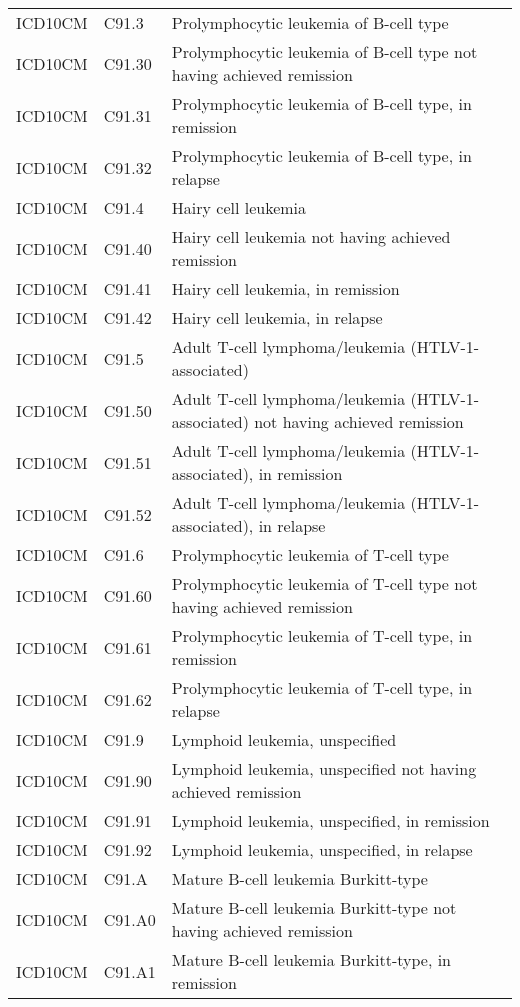 \begin{longtable}{p{}p{}p{}}
  ICD10CM & C91.3 & Prolymphocytic leukemia of B-cell type \\ 
  ICD10CM & C91.30 & Prolymphocytic leukemia of B-cell type not having achieved remission \\ 
  ICD10CM & C91.31 & Prolymphocytic leukemia of B-cell type, in remission \\ 
  ICD10CM & C91.32 & Prolymphocytic leukemia of B-cell type, in relapse \\ 
  ICD10CM & C91.4 & Hairy cell leukemia \\ 
  ICD10CM & C91.40 & Hairy cell leukemia not having achieved remission \\ 
  ICD10CM & C91.41 & Hairy cell leukemia, in remission \\ 
  ICD10CM & C91.42 & Hairy cell leukemia, in relapse \\ 
  ICD10CM & C91.5 & Adult T-cell lymphoma/leukemia (HTLV-1-associated) \\ 
  ICD10CM & C91.50 & Adult T-cell lymphoma/leukemia (HTLV-1-associated) not having achieved remission \\ 
  ICD10CM & C91.51 & Adult T-cell lymphoma/leukemia (HTLV-1-associated), in remission \\ 
  ICD10CM & C91.52 & Adult T-cell lymphoma/leukemia (HTLV-1-associated), in relapse \\ 
  ICD10CM & C91.6 & Prolymphocytic leukemia of T-cell type \\ 
  ICD10CM & C91.60 & Prolymphocytic leukemia of T-cell type not having achieved remission \\ 
  ICD10CM & C91.61 & Prolymphocytic leukemia of T-cell type, in remission \\ 
  ICD10CM & C91.62 & Prolymphocytic leukemia of T-cell type, in relapse \\ 
  ICD10CM & C91.9 & Lymphoid leukemia, unspecified \\ 
  ICD10CM & C91.90 & Lymphoid leukemia, unspecified not having achieved remission \\ 
  ICD10CM & C91.91 & Lymphoid leukemia, unspecified, in remission \\ 
  ICD10CM & C91.92 & Lymphoid leukemia, unspecified, in relapse \\ 
  ICD10CM & C91.A & Mature B-cell leukemia Burkitt-type \\ 
  ICD10CM & C91.A0 & Mature B-cell leukemia Burkitt-type not having achieved remission \\ 
  ICD10CM & C91.A1 & Mature B-cell leukemia Burkitt-type, in remission \\ 

\end{longtable}
